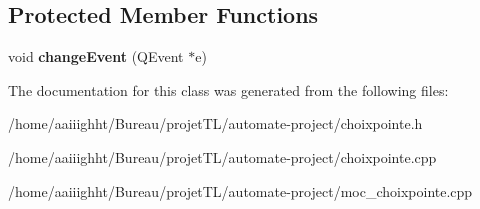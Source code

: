 \subsection*{Protected Member Functions}
\begin{DoxyCompactItemize}
\item 
\hypertarget{classchoix_pointe_a7becbc30c1a5f930c98336623595d181}{void {\bfseries change\-Event} (Q\-Event $\ast$e)}\label{classchoix_pointe_a7becbc30c1a5f930c98336623595d181}

\end{DoxyCompactItemize}


The documentation for this class was generated from the following files\-:\begin{DoxyCompactItemize}
\item 
/home/aaiiighht/\-Bureau/projet\-T\-L/automate-\/project/choixpointe.\-h\item 
/home/aaiiighht/\-Bureau/projet\-T\-L/automate-\/project/choixpointe.\-cpp\item 
/home/aaiiighht/\-Bureau/projet\-T\-L/automate-\/project/moc\-\_\-choixpointe.\-cpp\end{DoxyCompactItemize}
